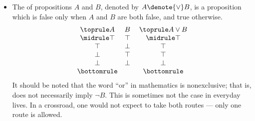 \begin{itemize}
    \item The  of propositions \(A\) and \(B\),
    denoted by \(A\denote{\vee} B\),
    is a proposition which is false
    only when \(A\) and \(B\) are both false,
    and true otherwise.
    \[
        \begin{array}{c c}\toprule
            A & B \\ \midrule
            \top & \top \\
            \top & \bot \\
            \bot & \top \\
            \bot & \bot \\ \bottomrule
        \end{array}
        \;
        \begin{array}{c}\toprule
            A\vee B \\ \midrule
            \top \\
            \top \\
            \top \\
            \bot \\ \bottomrule
        \end{array}
    \]
    It should be noted that
    the word ``or'' in mathematics is nonexclusive;
    that is, 
    does not necessarily imply \(\neg B\).
    This is sometimes not the case in everyday lives.
    In a crossroad, one would not expect to take both routes
    ---
    only one route is allowed.


\end{itemize}
